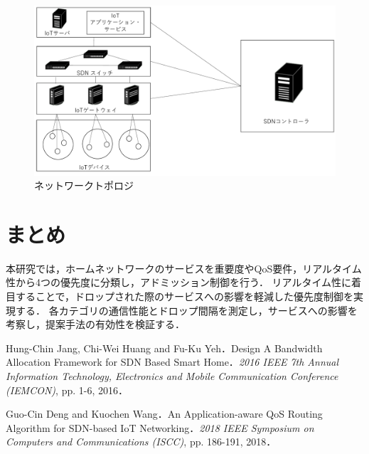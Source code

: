 \documentclass[a4paper,10pt,twocolumn,uplatex]{jsarticle}
\begin{document}
\begin{figure}[!tb]
  \centering
  \includegraphics[width=\linewidth]{img/AQRA_Architecture.pdf}
  \caption{ネットワークトポロジ}
  \label{fig:Architecture}
\end{figure}

\section{まとめ}
本研究では，ホームネットワークのサービスを重要度やQoS要件，リアルタイム性から4つの優先度に分類し，アドミッション制御を行う．
リアルタイム性に着目することで，ドロップされた際のサービスへの影響を軽減した優先度制御を実現する．
各カテゴリの通信性能とドロップ間隔を測定し，サービスへの影響を考察し，提案手法の有効性を検証する．

\footnotesize{
  \begin{thebibliography}{99}
     Hung-Chin Jang, Chi-Wei Huang and Fu-Ku Yeh．Design A Bandwidth Allocation Framework for SDN Based Smart Home．\textit{2016 IEEE 7th Annual Information Technology, Electronics and Mobile Communication Conference (IEMCON)}, pp. 1-6, 2016．

     Guo-Cin Deng and Kuochen Wang．An Application-aware QoS Routing Algorithm for SDN-based IoT Networking．\textit{2018 IEEE Symposium on Computers and Communications (ISCC)}, pp. 186-191, 2018．
  \end{thebibliography}
}

\end{document}
